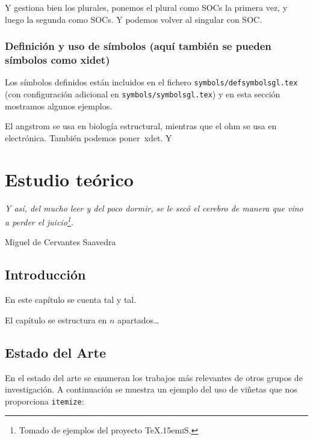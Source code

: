 \documentclass[spanish,openright]{book}
\def\texis{\TeX \raise.15em\hbox{\textsc{i}}S}
\newenvironment{FraseCelebre}{\begin{list}{}{\setlength{\leftmargin}{0.5\textwidth}\setlength{\parsep}{0cm}\addtolength{\topsep}{0.5cm}}
}
{\unskip \end{list}}
\newenvironment{Frase}{\item \begin{flushright}\small\em}{\end{flushright}}
\newenvironment{Fuente}{\item \begin{flushright}\small}{\end{flushright}}
\begin{document}
Y gestiona bien los plurales, ponemos el plural como \acp{SOC} la
primera vez, y luego la segunda como \acp{SOC}. Y podemos volver al
singular con \ac{SOC}.


\subsection{Definición y uso de símbolos (aquí también
se pueden símbolos como \ac{xidet})}
\label{sec:simbolos}

Los símbolos definidos están incluidos en el fichero
\texttt{symbols/defsymbolsgl.tex} (con configuración adicional en
\texttt{symbols/symbolsgl.tex}) y en esta sección mostramos algunos
ejemplos.

El \ac{angstrom} se usa en biología estructural, mientras que el
\ac{ohm} se usa en electrónica. También podemos poner~\ac{xdet}. Y



\chapter{Estudio teórico}
\label{cha:estudio-teorico}

\begin{FraseCelebre}
\begin{Frase}
Y así, del mucho leer y del poco dormir, se le secó el cerebro de
manera que vino a perder el juicio\footnote{Tomado de ejemplos del
proyecto \texis{}.}.
\end{Frase}
\begin{Fuente}
Miguel de Cervantes Saavedra
\end{Fuente}
\end{FraseCelebre}


\section{Introducción}
\label{sec:introduccion-teoria}

En este capítulo se cuenta tal y tal.

El capítulo se estructura en $n$ apartados\ldots


\section{Estado del Arte}
\label{sec:estadoarte}

En el estado del arte se enumeran los trabajos más relevantes de otros
grupos de investigación. A continuación se muestra un ejemplo del uso de
viñetas que nos proporciona \texttt{itemize}:
\end{document}

